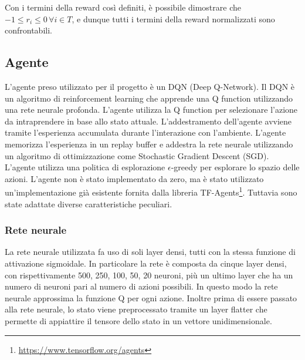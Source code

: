\documentclass[conference]{IEEEtran}
\begin{document}
Con i termini della reward così definiti, è possibile dimostrare che $ -1 \leq r_i \leq 0 \, \forall i \in T$, e dunque tutti i termini della reward normalizzati sono 
confrontabili.

\subsection{Agente}
L'agente preso utilizzato per il progetto è un DQN (Deep Q-Network). Il DQN è un algoritmo di reinforcement learning che apprende una Q function utilizzando una rete neurale profonda. L'agente utilizza la Q function per selezionare l'azione da intraprendere in base allo stato attuale. L'addestramento dell'agente avviene tramite l'esperienza accumulata durante l'interazione con l'ambiente. L'agente memorizza l'esperienza in un replay buffer e addestra la rete neurale utilizzando un algoritmo di ottimizzazione come Stochastic Gradient Descent (SGD). L'agente utilizza una politica di esplorazione $\epsilon$-greedy per esplorare lo spazio delle azioni. L'agente non è stato implementato da zero, ma è stato utilizzato un'implementazione già esistente fornita dalla libreria TF-Agents\footnote{\href{https://www.tensorflow.org/agents}{https://www.tensorflow.org/agents}}.
Tuttavia sono state adattate diverse caratteristiche peculiari.
\subsubsection{Rete neurale}
La rete neurale utilizzata fa uso di soli layer densi, tutti con la stessa funzione di attivazione sigmoidale. In particolare la rete è composta da cinque layer densi, con rispettivamente 500, 250, 100, 50, 20 neuroni, più un ultimo layer che ha un numero di neuroni pari al numero di azioni possibili. In questo modo la rete neurale approssima la funzione Q per ogni azione. Inoltre prima di essere passato alla rete neurale, lo stato viene preprocessato tramite un layer flatter che permette di appiattire il tensore dello stato in un vettore unidimensionale. 
\end{document}
